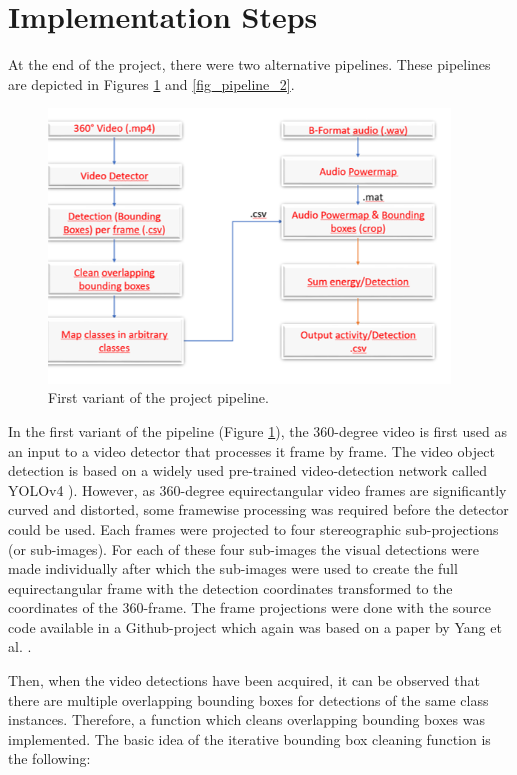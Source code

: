 \section{Implementation Steps} \label{sec_implementation_steps}

At the end of the project, there were two alternative pipelines. These pipelines are depicted in Figures \ref{fig_pipeline_1} and \ref{fig_pipeline_2}.

\begin{figure}[h]
    \centering
    \includegraphics[width=0.95\textwidth]{figures/pipeline_1.png}
    \caption{First variant of the project pipeline.}
    \label{fig_pipeline_1}
\end{figure}

In the first variant of the pipeline (Figure \ref{fig_pipeline_1}), the 360-degree video is first used as an input to a video detector that processes it frame by frame. The video object detection is based on a widely used pre-trained video-detection network called YOLOv4 \cite{yolov4_paper}). However, as 360-degree equirectangular video frames are significantly curved and distorted, some framewise processing was required before the detector could be used. Each frames were projected to four stereographic sub-projections (or sub-images). For each of these four sub-images the visual detections were made individually after which the sub-images were used to create the full equirectangular frame with the detection coordinates transformed to the coordinates of the 360-frame. The frame projections were done with the source code available in a Github-project \cite{mpyolo} which again was based on a paper by Yang et al. \cite{mpyolo_paper}.

Then, when the video detections have been acquired, it can be observed that there are multiple overlapping bounding boxes for detections of the same class instances. Therefore, a function which cleans overlapping bounding boxes was implemented. The basic idea of the iterative bounding box cleaning function is the following:

